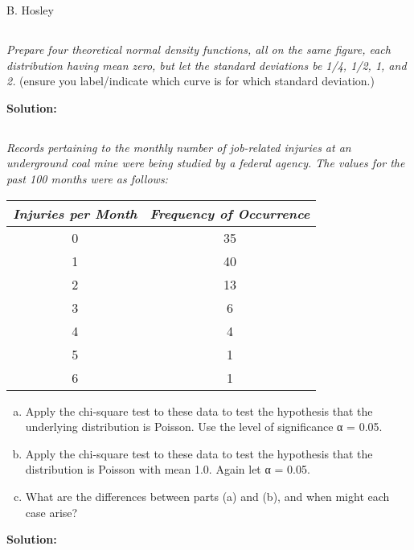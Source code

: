 \documentclass[12pt]{amsart}
\begin{document}
\raggedbottom

\hspace{\fill} {\large B. Hosley}
\bigskip


\setcounter{section}{9}
\setcounter{subsection}{5}
\subsection{} %
	\textit{Prepare four theoretical normal density functions, 
		all on the same ﬁgure, each distribution having mean zero,
		 but let the standard deviations be 1/4, 1/2, 1, and 2.}	
		(ensure you label/indicate which curve is for which standard deviation.)
		
		\bigskip
		\textbf{Solution:}
	
	
\setcounter{subsection}{15}
\subsection{} %
	\textit{Records pertaining to the monthly number of job-related injuries 
		at an underground coal mine were being studied by a federal agency. 
		The values for the past 100 months were as follows:}
	\begin{tabular}{cc}
		\toprule
		\textit{Injuries per Month} & \textit{Frequency of Occurrence} \\
		\midrule
		0 & 35 \\
		1 & 40 \\
		2 & 13 \\
		3 & 6 \\
		4 & 4 \\
		5 & 1 \\
		6 & 1 \\
		\bottomrule
	\end{tabular}
	\begin{enumerate}[(a)]
		\item Apply the chi-square test to these data to test the hypothesis that the underlying distribution is Poisson. Use the level of signiﬁcance α = 0.05.
		\item Apply the chi-square test to these data to test the hypothesis that the distribution is Poisson with mean 1.0. Again let α = 0.05.
		\item What are the differences between parts (a) and (b), and when might each case arise?
	\end{enumerate}

	\bigskip
	\textbf{Solution:}
	
	
\end{document}
